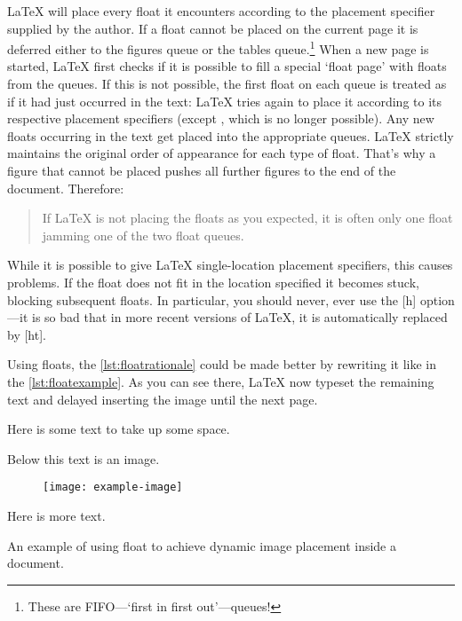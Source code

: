 \LaTeX{} will place every float it encounters according to the placement
specifier supplied by the author. If a float cannot be placed on the current
page it is deferred either to the figures queue or the tables
queue.\footnote{These are FIFO---`first in first out'---queues!}  When a new
page is started, \LaTeX{} first checks if it is possible to fill a special
\enquote*{float page} with floats from the queues. If this is not possible, the
first float on each queue is treated as if it had just occurred in the text:
\LaTeX{} tries again to place it according to its respective placement
specifiers (except , which is no longer possible).  Any new floats
occurring in the text get placed into the appropriate queues. \LaTeX{} strictly
maintains the original order of appearance for each type of float. That's why a
figure that cannot be placed pushes all further figures to the end of the
document. Therefore:
\begin{quote}
  If \LaTeX{} is not placing the floats as you expected,
  it is often only one float jamming one of the two float queues.
\end{quote}

While it is possible to give \LaTeX{}  single-location placement specifiers,
this causes problems.  If the float does not fit in the location specified it
becomes stuck, blocking subsequent floats. In particular, you should never,
ever use the [h] option---it is so bad that in more recent versions of \LaTeX,
it is automatically replaced by [ht].

Using floats, the \autoref{lst:floatrationale} could be made better by
rewriting it like in the \autoref{lst:floatexample}. As you can see there,
\LaTeX{} now typeset the remaining text and delayed inserting the image until
the next page.
\begin{listing}
  \begin{lined}{11cm}
    \begin{example}[standalone, paperheight=4cm, to_page=2, vertical_pages]
\usepackage{graphicx} %
\geometry{includefoot} %
Here is some text
to take up some space.

Below this text is an image.

\begin{figure}
  \centering
  \texttt{[image: example-image]}
\end{figure}

Here is more text.
\end{example}
  \end{lined}
  \caption{An example of using  float to achieve dynamic image
    placement inside a document.}\label{lst:floatexample}
\end{listing}

